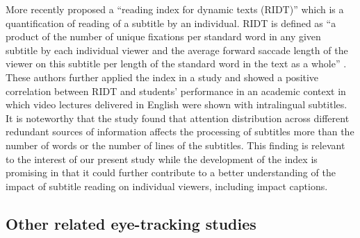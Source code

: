 \documentclass[output=paper]{langsci/langscibook}
\begin{document}
More recently \citet{Kruger2014} proposed a ``reading index for dynamic texts (RIDT)'' which is a quantification of reading of a subtitle by an individual. RIDT is defined as ``a product of the number of unique fixations per standard word in any given subtitle by each individual viewer and the average forward saccade length of the viewer on this subtitle per length of the standard word in the text as a whole'' \citep[110]{Kruger2014}.  These authors further applied the index in a study and showed a positive correlation between RIDT and students' performance in an academic context in which video lectures delivered in English were shown with intralingual subtitles. It is noteworthy that the study found that attention distribution across different redundant sources of information affects the processing of subtitles more than the number of words or the number of lines of the subtitles. This finding is relevant to the interest of our present study while the development of the index is promising in that it could further contribute to a better understanding of the impact of subtitle reading on individual viewers, including impact captions.


\subsection{Other related eye-tracking studies}
\end{document}

